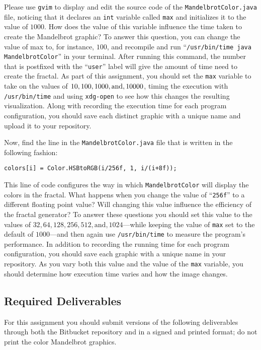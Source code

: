 Please use {\tt gvim} to display and edit the source code of the {\tt MandelbrotColor.java} file, noticing that it
declares an {\tt int} variable called {\tt max} and initializes it to the value of $1000$. How does the value of this
variable influence the time taken to create the Mandelbrot graphic? To answer this question, you can change the value of
max to, for instance, $100$, and recompile and run ``{\tt /usr/bin/time java MandelbrotColor}'' in your terminal.  After
running this command, the number that is postfixed with the ``{\tt user}'' label will give the amount of time need to create
the fractal. As part of this assignment, you should set the {\tt max} variable to take on the values of $10, 100, 1000,
\mbox{and}, \- 10000$, timing the execution with {\tt /usr/bin/time} and using {\tt xdg-open} to see how this changes the
resulting visualization. Along with recording the execution time for each program configuration, you should save each
distinct graphic with a unique name and upload it to your repository.

Now, find the line in the {\tt MandelbrotColor.java} file that is written in the following fashion:

{\tt colors[i] = Color.HSBtoRGB(i/256f, 1, i/(i+8f));}

\noindent This line of code configures the way in which {\tt MandelbrotColor} will display the colors in the fractal.
What happens when you change the value of ``{\tt 256f}'' to a different floating point value? Will changing this value
influence the efficiency of the fractal generator? To answer these questions you should set this value to the values of
$32, 64, 128, 256, 512, \mbox{and}, 1024$---while keeping the value of {\tt max} set to the default of $1000$---and then
again use {\tt /usr/bin/time} to measure the program's performance. In addition to recording the running time for each
program configuration, you should save each graphic with a unique name in your repository.  As you vary both this value
and the value of the {\tt max} variable, you should determine how execution time varies and how the image changes.

\vspace{-0.15in}
\subsection*{Required Deliverables}
\vspace{-0.05in}

For this assignment you should submit versions of the following deliverables through both the Bitbucket
repository and in a signed and printed format; do not print the color Mandelbrot graphics.

